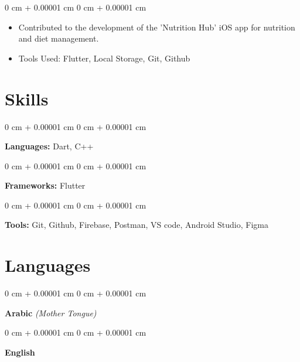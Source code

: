 \documentclass[10pt, letterpaper]{article}
\newenvironment{highlights}{
    \begin{itemize}[
        topsep=0.10 cm,
        parsep=0.10 cm,
        partopsep=0pt,
        itemsep=0pt,
        leftmargin=0 cm + 10pt
    ]
}{
    \end{itemize}
} %
\newenvironment{onecolentry}{
    \begin{adjustwidth}{
        0 cm + 0.00001 cm
    }{
        0 cm + 0.00001 cm
    }
}{
    \end{adjustwidth}
} %
\begin{document}
        \vspace{0.10 cm}
        \begin{onecolentry}
            \begin{highlights}
                \item Contributed to the development of the 'Nutrition Hub' iOS app for nutrition and diet management.
                \item Tools Used: Flutter, Local Storage, Git, Github
            \end{highlights}
        \end{onecolentry}



    
  

    
    \section{Skills}



        
        \begin{onecolentry}
            \textbf{Languages:} Dart, C++
        \end{onecolentry}

        \vspace{0.2 cm}

        \begin{onecolentry}
            \textbf{Frameworks:} Flutter
        \end{onecolentry}

        \vspace{0.2 cm}

        \begin{onecolentry}
            \textbf{Tools:} Git, Github, Firebase, Postman, VS code, Android Studio, Figma
        \end{onecolentry}

        

 

    \section{Languages}
        \begin{onecolentry}
            \textbf{Arabic}
            \hspace{0.2 cm}
            \textit{(Mother Tongue)}
        \end{onecolentry}

        \vspace{0.2 cm}

        \begin{onecolentry}
            \textbf{English}
        \end{onecolentry}


    
\end{document}
